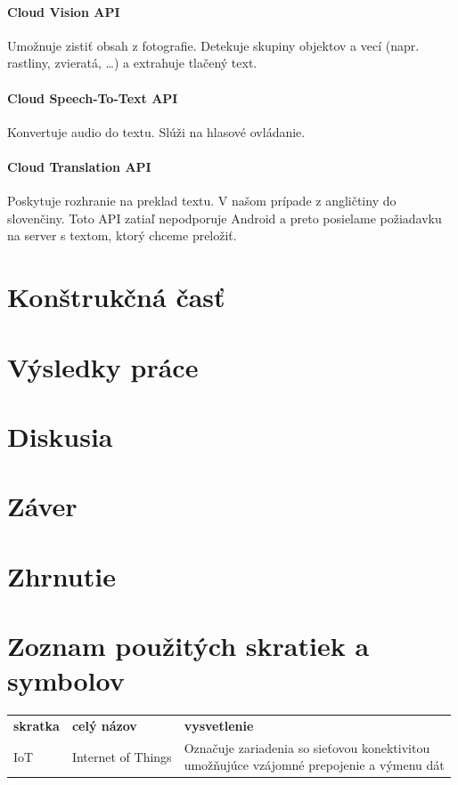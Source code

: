 \documentclass{template/socthesis}
\begin{document}
\subsubsection{Cloud Vision API}
Umožnuje zistiť obsah z fotografie. Detekuje skupiny objektov a vecí (napr. rastliny, zvieratá, …) a extrahuje tlačený text.
\subsubsection{Cloud Speech-To-Text API}
Konvertuje audio do textu. Slúži na hlasové ovládanie.
\subsubsection{Cloud Translation API}
Poskytuje rozhranie na preklad textu. V našom prípade z angličtiny do slovenčiny. Toto API zatiaľ nepodporuje Android a preto posielame požiadavku na server s textom, ktorý chceme preložiť.

\chapter{Konštrukčná časť}
\newpage



\chapter*{Výsledky práce}
\newpage
\chapter*{Diskusia}
\newpage
\chapter*{Záver}
\newpage
\chapter*{Zhrnutie}
\newpage

\printbibliography[title=Zoznam použitej literatúry]
\newpage

\chapter*{Zoznam použitých skratiek a symbolov}
\begin{table}[!ht]
	\begin{tabular}{lll}
		\textbf{skratka} & \textbf{celý názov} & \textbf{vysvetlenie} \\
		IoT              & Internet of Things  & \makecell{Označuje zariadenia	so sieťovou konektivitou\\ umožňujúce vzájomné prepojenie a výmenu dát}       
	\end{tabular}
\end{table}
\end{document}

